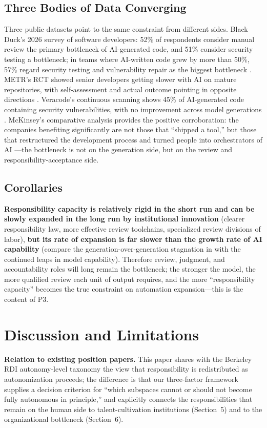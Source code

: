 \documentclass[11pt]{article}
\begin{document}
\subsection{Three Bodies of Data Converging}
Three public datasets point to the same constraint from different sides.
Black Duck's 2026 survey of software developers: 52\% of respondents
consider manual review the primary bottleneck of AI-generated code, and
51\% consider security testing a bottleneck; in teams where AI-written code
grew by more than 50\%, 57\% regard security testing and vulnerability
repair as the biggest bottleneck \cite{blackduck}. METR's RCT showed senior
developers getting slower with AI on mature repositories, with
self-assessment and actual outcome pointing in opposite directions
\cite{metr}. Veracode's continuous scanning shows 45\% of AI-generated code
containing security vulnerabilities, with no improvement across model
generations \cite{veracode}. McKinsey's comparative analysis provides the
positive corroboration: the companies benefiting significantly are not
those that ``shipped a tool,'' but those that restructured the development
process and turned people into orchestrators of AI \cite{mckinsey}---the
bottleneck is not on the generation side, but on the review and
responsibility-acceptance side.

\subsection{Corollaries}
\textbf{Responsibility capacity is relatively rigid in the short run and can
be slowly expanded in the long run by institutional innovation} (clearer
responsibility law, more effective review toolchains, specialized review
divisions of labor), \textbf{but its rate of expansion is far slower than
the growth rate of AI capability} (compare the generation-over-generation
stagnation in \cite{veracode} with the continued leaps in model
capability). Therefore review, judgment, and accountability roles will long
remain the bottleneck; the stronger the model, the more qualified review
each unit of output requires, and the more ``responsibility capacity''
becomes the true constraint on automation expansion---this is the content
of P3.

\section{Discussion and Limitations}
\textbf{Relation to existing position papers.} This paper shares with the
Berkeley RDI autonomy-level taxonomy \cite{berkeleyrdi} the view that
responsibility is redistributed as autonomization proceeds; the difference
is that our three-factor framework supplies a decision criterion for
``which subspaces cannot or should not become fully autonomous in
principle,'' and explicitly connects the responsibilities that remain on
the human side to talent-cultivation institutions (Section~5) and to the
organizational bottleneck (Section~6).
\end{document}

